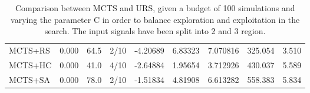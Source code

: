 \documentclass[11pt]{article}
\begin{document}
\begin{table}[ht]
\begin{tabular}{|l|l|c|c|c|c|c|c|c|}
MCTS+RS                                     & 0.000              &  64.5                   & 2/10                          & -4.20689  & 6.83323  & 7.070816 &  325.054 &  3.510    \\
MCTS+HC                                     & 0.000              &  41.0                   & 4/10                          & -2.64884  & 1.95654  & 3.712926 &  430.037 &  5.589    \\
MCTS+SA                                     & 0.000              &  78.0                   & 2/10                          & -1.51834  & 4.81908  & 6.613282 &  558.383 &  5.834    \\ \hline
\end{tabular}
\caption{Comparison between MCTS and URS, given a budget of 100 simulations and varying the parameter C in order to balance exploration and exploitation in the search. The input signals have been split into 2 and 3 region.}~\label{table:res:s1}
\end{table}
\end{document}
